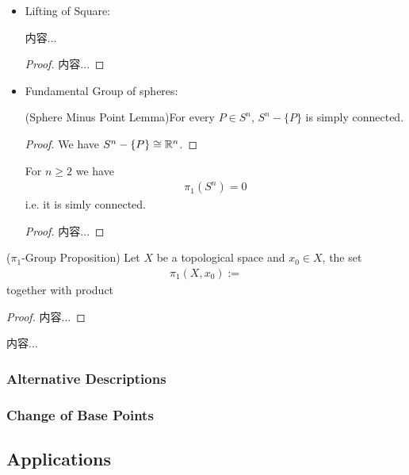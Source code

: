 \documentclass[Total.tex]{subfiles}
\begin{document}
\begin{itemize}
\begin{proof}
					\end{proof}
					\item Lifting of Square:
					\begin{lemma}
						内容...
					\end{lemma}
					\begin{proof}
						内容...
					\end{proof}
					\item Fundamental Group of spheres:
					\begin{lemma}
						(Sphere Minus Point Lemma)For every $P\in S^n$, $S^n-\{P\}$ is simply connected.
					\end{lemma}
					\begin{proof}
						We have $S^n-\{P\}\cong \mathbb{R}^n$. 
					\end{proof}
					\begin{proposition}
						For $n\geq 2$ we have
						\begin{gather*}
							\pi_1(S^n)=0
						\end{gather*}
						i.e. it is simly connected.
					\end{proposition}
					\begin{proof}
						内容...
					\end{proof}
					
				\end{itemize}
				
				\begin{proposition}
					($\pi_1$-Group Proposition) Let $X$ be a topological space and $x_0\in X$, the set
					\begin{gather*}
						\pi_1(X,x_0):=
					\end{gather*}
					together with product
				\end{proposition}
				\begin{proof}
					内容...
				\end{proof}
				
				\begin{Def}
					内容...
				\end{Def}
			\subsubsection{Alternative Descriptions}
				
			\subsubsection{Change of Base Points}
			\subsection{Applications}
\end{document}
